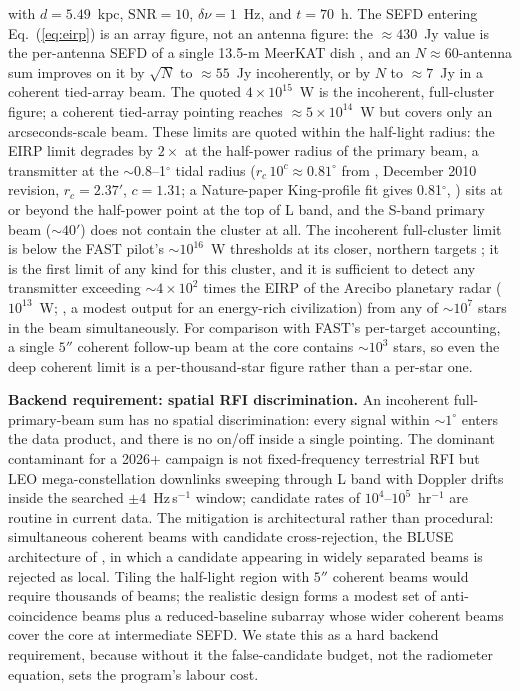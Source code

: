 \documentclass[11pt]{article}
\begin{document}
with $d = 5.49$~kpc, $\mathrm{SNR} = 10$, $\delta\nu = 1$~Hz, and $t = 70$~h. The SEFD entering Eq.~(\ref{eq:eirp}) is an array figure, not an antenna figure: the $\approx 430$~Jy value is the per-antenna SEFD of a single 13.5-m MeerKAT dish \citep{Jonas2016}, and an $N \approx 60$-antenna sum improves on it by $\sqrt{N}$ to $\approx 55$~Jy incoherently, or by $N$ to $\approx 7$~Jy in a coherent tied-array beam. The quoted $4\times10^{15}$~W is the incoherent, full-cluster figure; a coherent tied-array pointing reaches $\approx 5\times10^{14}$~W but covers only an arcseconds-scale beam. These limits are quoted within the half-light radius: the EIRP limit degrades by $2\times$ at the half-power radius of the primary beam, a transmitter at the $\sim$0.8--1$^{\circ}$ tidal radius ($r_c\,10^{c}\approx0.81^{\circ}$ from \citealt{Harris1996}, December 2010 revision, $r_c=2.37'$, $c=1.31$; a Nature-paper King-profile fit gives 0.81$^{\circ}$, \citealt{Haberle2024Nature}) sits at or beyond the half-power point at the top of L band, and the S-band primary beam ($\sim 40'$) does not contain the cluster at all. The incoherent full-cluster limit is below the FAST pilot's $\sim 10^{16}$~W thresholds at its closer, northern targets \citep{Huang2026}; it is the first limit of any kind for this cluster, and it is sufficient to detect any transmitter exceeding $\sim 4\times10^{2}$ times the EIRP of the Arecibo planetary radar ($10^{13}$~W; \citealt{Enriquez2017}, a modest output for an energy-rich civilization) from any of $\sim 10^{7}$ stars in the beam simultaneously. For comparison with FAST's per-target accounting, a single $5''$ coherent follow-up beam at the core contains $\sim 10^{3}$ stars, so even the deep coherent limit is a per-thousand-star figure rather than a per-star one.

\textbf{Backend requirement: spatial RFI discrimination.} An incoherent full-primary-beam sum has no spatial discrimination: every signal within $\sim1^{\circ}$ enters the data product, and there is no on/off inside a single pointing. The dominant contaminant for a 2026+ campaign is not fixed-frequency terrestrial RFI but LEO mega-constellation downlinks sweeping through L band with Doppler drifts inside the searched $\pm 4$~Hz\,s$^{-1}$ window; candidate rates of $10^{4}$--$10^{5}$~hr$^{-1}$ are routine in current data. The mitigation is architectural rather than procedural: simultaneous coherent beams with candidate cross-rejection, the BLUSE architecture of \citet{Czech2021}, in which a candidate appearing in widely separated beams is rejected as local. Tiling the half-light region with $5''$ coherent beams would require thousands of beams; the realistic design forms a modest set of anti-coincidence beams plus a reduced-baseline subarray whose wider coherent beams cover the core at intermediate SEFD. We state this as a hard backend requirement, because without it the false-candidate budget, not the radiometer equation, sets the program's labour cost.
\end{document}
